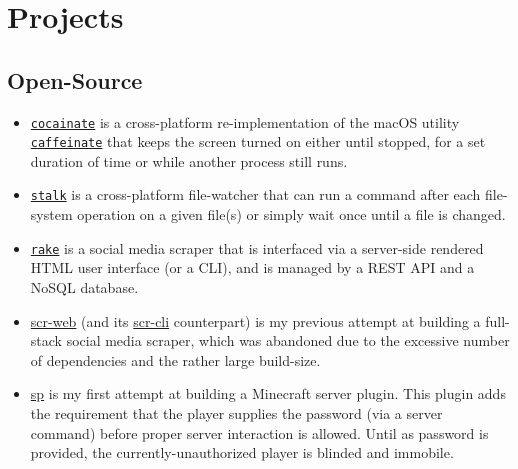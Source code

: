 \documentclass[a4paper, 10pt]{article}
\begin{document}
	\section{Projects}
	\subsection{Open-Source}

	\begin{itemize}
		\item \href{https://github.com/AppleGamer22/cocainate}{\texttt{cocainate}} is a cross-platform re-implementation of the macOS utility \href{https://github.com/apple-oss-distributions/PowerManagement/tree/main/caffeinate}{\texttt{caffeinate}} that keeps the screen turned on either until stopped, for a set duration of time or while another process still runs.
		\item \href{https://github.com/AppleGamer22/stalk}{\texttt{stalk}} is a cross-platform file-watcher that can run a command after each file-system operation on a given file(s) or simply wait once until a file is changed.
		\item \href{https://github.com/AppleGamer22/rake}{\texttt{rake}} is a social media scraper that is interfaced via a server-side rendered HTML user interface (or a CLI), and is managed by a REST API and a NoSQL database.
		\item \href{https://github.com/AppleGamer22/scr-web}{scr-web} (and its \href{https://github.com/AppleGamer22/scr-cli}{scr-cli} counterpart) is my previous attempt at building a full-stack social media scraper, which was abandoned due to the excessive number of dependencies and the rather large build-size.
		\item \href{https://github.com/AppleGamer22/sp}{sp} is my first attempt at building a Minecraft server plugin. This plugin adds the requirement that the player supplies the password (via a server command) before proper server interaction is allowed. Until as password is provided, the currently-unauthorized player is blinded and immobile.
	\end{itemize}
\end{document}
